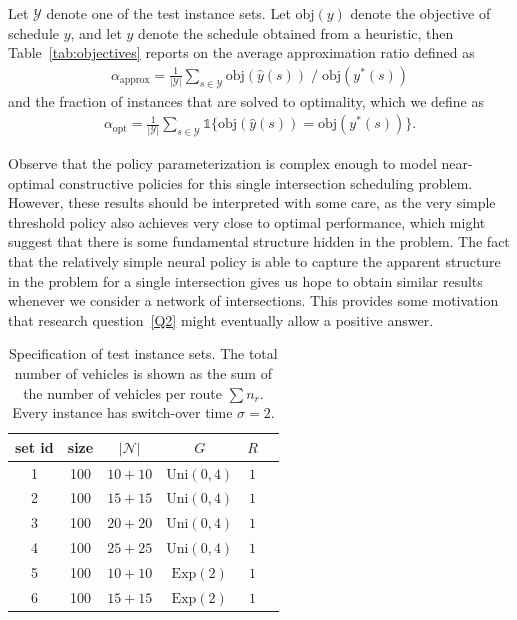 \documentclass{article}
\theoremstyle{definition}
\theoremstyle{plain}
\begin{document}
Let $\mathcal{Y}$ denote one of the test instance sets. Let $\text{obj}(y)$
denote the objective of schedule $y$, and let $\hat{y}$ denote the schedule
obtained from a heuristic, then Table~\ref{tab:objectives} reports on the
average approximation ratio defined as
\begin{align*}
  \alpha_{\text{approx}} = \frac{1}{|\mathcal{Y}|} \sum_{s \in \mathcal{Y}} \text{obj}(\hat{y}(s)) \; / \; \text{obj}(y^{*}(s))
\end{align*}
and the fraction of instances that are solved to optimality, which
we define as
\begin{align*}
  \alpha_{\text{opt}} = \frac{1}{|\mathcal{Y}|} \sum_{s \in \mathcal{Y}} \mathds{1}\{ \text{obj}(\hat{y}(s)) = \text{obj}(y^{*}(s)) \} .
\end{align*}


Observe that the policy parameterization is complex enough to model near-optimal
constructive policies for this single intersection scheduling problem. However,
these results should be interpreted with some care, as the very simple threshold
policy also achieves very close to optimal performance, which might suggest that
there is some fundamental structure hidden in the problem.
%
The fact that the relatively simple neural policy is able to capture the
apparent structure in the problem for a single intersection gives us hope to
obtain similar results whenever we consider a network of intersections. This
provides some motivation that research question~\ref{Q2} might eventually allow
a positive answer.



\begin{table}[H]
  \caption{Specification of test instance sets. The total number of vehicles is
    shown as the sum of the number of vehicles per route $\sum n_{r}$. Every
    instance has switch-over time $\sigma = 2$.}\label{tab:params}
  \vspace{0.5em}
  \centering
  \begin{tabular}[t]{c c c c c c}
    \toprule
    set id & size & $|\mathcal{N}|$ & $G$ & $R$ \\
    \midrule

    1 & 100 & $10 + 10$ & $\text{Uni}(0, 4)$ & $1$ \\
    2 & 100 & $15 + 15$ & $\text{Uni}(0, 4)$ & $1$ \\
    3 & 100 & $20 + 20$ & $\text{Uni}(0, 4)$ & $1$ \\
    4 & 100 & $25 + 25$ & $\text{Uni}(0, 4)$ & $1$ \\ %

    5 & 100 & $10 + 10$ & $\text{Exp}(2)$    & $1$ \\
    6 & 100 & $15 + 15$ & $\text{Exp}(2)$    & $1$ \\

    \bottomrule
  \end{tabular}
\end{table}
\end{document}
